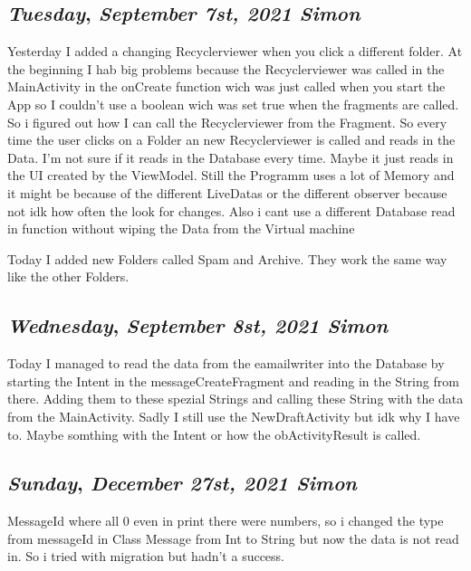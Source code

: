 \begin{center}
\section*{\month}
\end{center}


\def\day{\textit{September 7st, 2021 Simon}}
\def\weekday{\textit{Tuesday}}
\subsection*{\weekday, \day}

Yesterday I added a changing Recyclerviewer when you click a different folder.
At the beginning I hab big problems because the Recyclerviewer was called in the MainActivity
in the onCreate function wich was just called when you start the App so I couldn't use a boolean wich was set 
true when the fragments are called. So i figured out how I can call the Recyclerviewer from the Fragment. So every time 
the user clicks on a Folder an new Recyclerviewer is called and reads in the Data. I'm not sure if it reads in the Database every time. 
Maybe it just reads in the UI created by the ViewModel. Still the Programm uses a lot of Memory and it might be because of the 
different LiveDatas or the different observer because not idk how often the look for changes. Also i cant use a different Database read in function 
without wiping the Data from the Virtual machine

Today I added new Folders called Spam and Archive. They work the same way like the other Folders. 


\def\day{\textit{September 8st, 2021 Simon}}
\def\weekday{\textit{Wednesday}}
\subsection*{\weekday, \day}

Today I managed to read the data from the eamailwriter into the Database
by starting the Intent in the messageCreateFragment and reading in the String from there. Adding them to these 
spezial Strings and calling these String with the data from the MainActivity. Sadly I still use the NewDraftActivity but idk why I have to.
Maybe somthing with the Intent or how the obActivityResult is called.


\def\day{\textit{December 27st, 2021 Simon}}
\def\weekday{\textit{Sunday}}
\subsection*{\weekday, \day}

MessageId where all 0 even in print there were numbers, so i changed the type from messageId in Class Message from 
Int to String but now the data is not read in. So i tried with migration but hadn't a success. 
